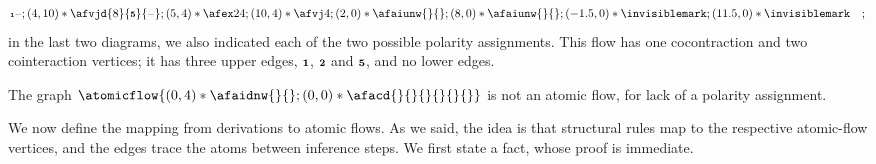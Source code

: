 \documentclass[a4paper]{LMCS}
\begin{document}
\begin{exa}
\[{{{{                              {\scriptscriptstyle\mathbf1}}}{{\mathchoice{\scriptstyle-}
                                {\scriptstyle-}
                                {\scriptstyle-}
                                {\scriptscriptstyle-}}}};
( 4  ,10)*{\afvjd{8}{{\mathchoice{\scriptstyle\mathbf5}
                                {\scriptstyle\mathbf5}
                                {\scriptstyle\mathbf5}
                                {\scriptscriptstyle\mathbf5}}}{{\mathchoice{\scriptstyle-}
                                {\scriptstyle-}
                                {\scriptstyle-}
                                {\scriptscriptstyle-}}}};
( 5  , 4)*{\afex24};
(10  , 4)*{\afvj4};
( 2  , 0)*{\afaiunw{}{}};
( 8  , 0)*{\afaiunw{}{}};
(-1.5, 0)*{\invisiblemark};
(11.5, 0)*{\invisiblemark}}
\quad;
\]
\afnegspace
in the last two diagrams, we also indicated each of the two possible polarity assignments. This flow has one cocontraction and two cointeraction vertices; it has three upper edges, ${{\mathchoice{\scriptstyle\mathbf1}
                              {\scriptstyle\mathbf1}
                              {\scriptstyle\mathbf1}
                              {\scriptscriptstyle\mathbf1}}}$, ${{\mathchoice{\scriptstyle\mathbf2}
                              {\scriptstyle\mathbf2}
                              {\scriptstyle\mathbf2}
                              {\scriptscriptstyle\mathbf2}}}$ and ${{\mathchoice{\scriptstyle\mathbf5}
                                {\scriptstyle\mathbf5}
                                {\scriptstyle\mathbf5}
                                {\scriptscriptstyle\mathbf5}}}$, and no lower edges.
\end{exa}

\afnegspace
\begin{exa}
The graph
$\atomicflow{
(0,4)*{\afaidnw{}{}};
(0,0)*{\afacd{}{}{}{}{}{}}}$
is not an atomic flow, for lack of a polarity assignment.
\end{exa}

We now define the mapping from derivations to atomic flows. As we said, the idea is that structural rules map to the respective atomic-flow vertices, and the edges trace the atoms between inference steps. We first state a fact, whose proof is immediate.
\end{document}
